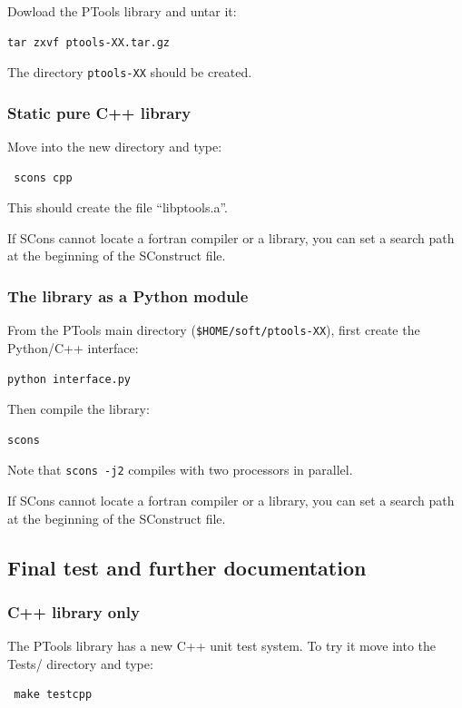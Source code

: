 \documentclass[12pt,a4paper]{article}
\begin{document}
Dowload the PTools library and untar it:

\begin{verbatim}
tar zxvf ptools-XX.tar.gz
\end{verbatim}
The directory {\tt ptools-XX} should be created.


\subsubsection{Static pure C++ library}

Move into the new directory and type:

\begin{verbatim}
 scons cpp
\end{verbatim}

This should create the file ``libptools.a''.

If SCons cannot locate a fortran compiler or a library, you can set a search path at the beginning of
the SConstruct file.


\subsubsection{The library as a Python module}

From the PTools main directory ({\tt \$HOME/soft/ptools-XX}), 
first create the Python/C++ interface:
\begin{verbatim}
python interface.py
\end{verbatim}

Then compile the library:
\begin{verbatim}
scons
\end{verbatim}

Note that {\tt scons -j2} compiles with two processors in parallel.

If SCons cannot locate a fortran compiler or a library, you can set a search path at the beginning of
the SConstruct file.


\subsection{Final test and further documentation}

\subsubsection{C++ library only}

The PTools library has a new C++ unit test system. To try it move into the Tests/ directory and
type: 
\begin{verbatim}
 make testcpp
\end{verbatim}
\end{document}
